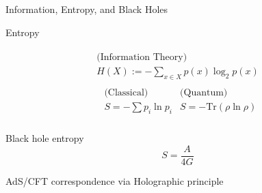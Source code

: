 \documentclass{beamer}
\begin{document}
\begin{frame}{Information, Entropy, and Black Holes}

Entropy

\[
\begin{gathered}
\begin{gathered}
\text{(Information Theory)} \\
H(X) := -\sum_{x \in X} p(x) \log_2{p(x)} 
\end{gathered} \\
\begin{aligned} 
 & \text{(Classical)} & \text{(Quantum)} \\
& S = - \sum p_i \ln{ p_i} & S = -\text{Tr}{ (\rho \ln{ \rho } )} \\
\end{aligned}
\end{gathered}
\]

Black hole entropy
\begin{equation*}
S = \frac{A}{4 G }
\end{equation*}

\end{frame}

\begin{frame}{AdS/CFT correspondence via Holographic principle}

\end{frame}
\end{document}
